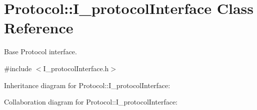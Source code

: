 \hypertarget{classProtocol_1_1I__protocolInterface}{}\section{Protocol\+::I\+\_\+protocol\+Interface Class Reference}
\label{classProtocol_1_1I__protocolInterface}


Base Protocol interface.  




{\ttfamily \#include $<$I\+\_\+protocol\+Interface.\+h$>$}



Inheritance diagram for Protocol\+::I\+\_\+protocol\+Interface\+:


Collaboration diagram for Protocol\+::I\+\_\+protocol\+Interface\+:
